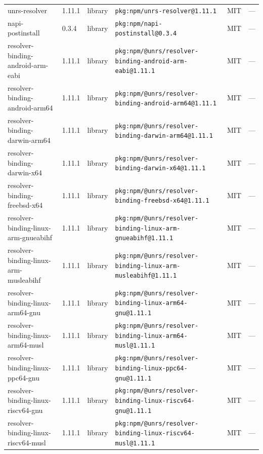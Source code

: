 \documentclass[11pt,a4paper]{article}
\begin{document}
\begin{longtable}{|p{4cm}|p{2cm}|p{1.6cm}|p{5cm}|p{1.5cm}|p{3.5cm}|}
\raggedright unrs-resolver & 1.11.1 & library & \small\texttt{pkg:npm/unrs-resolver@1.11.1} & MIT & \small — \\
\raggedright napi-postinstall & 0.3.4 & library & \small\texttt{pkg:npm/napi-postinstall@0.3.4} & MIT & \small — \\
\raggedright resolver-binding-android-arm-eabi & 1.11.1 & library & \small\texttt{pkg:npm/@unrs/resolver-binding-android-arm-eabi@1.11.1} & MIT & \small — \\
\raggedright resolver-binding-android-arm64 & 1.11.1 & library & \small\texttt{pkg:npm/@unrs/resolver-binding-android-arm64@1.11.1} & MIT & \small — \\
\raggedright resolver-binding-darwin-arm64 & 1.11.1 & library & \small\texttt{pkg:npm/@unrs/resolver-binding-darwin-arm64@1.11.1} & MIT & \small — \\
\raggedright resolver-binding-darwin-x64 & 1.11.1 & library & \small\texttt{pkg:npm/@unrs/resolver-binding-darwin-x64@1.11.1} & MIT & \small — \\
\raggedright resolver-binding-freebsd-x64 & 1.11.1 & library & \small\texttt{pkg:npm/@unrs/resolver-binding-freebsd-x64@1.11.1} & MIT & \small — \\
\raggedright resolver-binding-linux-arm-gnueabihf & 1.11.1 & library & \small\texttt{pkg:npm/@unrs/resolver-binding-linux-arm-gnueabihf@1.11.1} & MIT & \small — \\
\raggedright resolver-binding-linux-arm-musleabihf & 1.11.1 & library & \small\texttt{pkg:npm/@unrs/resolver-binding-linux-arm-musleabihf@1.11.1} & MIT & \small — \\
\raggedright resolver-binding-linux-arm64-gnu & 1.11.1 & library & \small\texttt{pkg:npm/@unrs/resolver-binding-linux-arm64-gnu@1.11.1} & MIT & \small — \\
\raggedright resolver-binding-linux-arm64-musl & 1.11.1 & library & \small\texttt{pkg:npm/@unrs/resolver-binding-linux-arm64-musl@1.11.1} & MIT & \small — \\
\raggedright resolver-binding-linux-ppc64-gnu & 1.11.1 & library & \small\texttt{pkg:npm/@unrs/resolver-binding-linux-ppc64-gnu@1.11.1} & MIT & \small — \\
\raggedright resolver-binding-linux-riscv64-gnu & 1.11.1 & library & \small\texttt{pkg:npm/@unrs/resolver-binding-linux-riscv64-gnu@1.11.1} & MIT & \small — \\
\raggedright resolver-binding-linux-riscv64-musl & 1.11.1 & library & \small\texttt{pkg:npm/@unrs/resolver-binding-linux-riscv64-musl@1.11.1} & MIT & \small — \\

\end{longtable}
\end{document}
